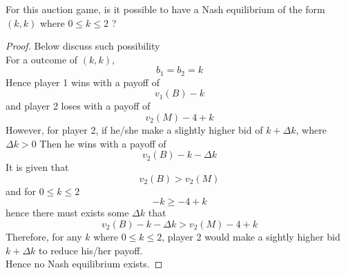 \documentclass[12pt]{article}
\newenvironment{question}[2][Question]{\begin{trivlist}
\item[\hskip \labelsep {\bfseries #1}\hskip \labelsep {\bfseries #2.}]}{\end{trivlist}}
\begin{document}
\begin{question}{2c}
	For this auction game, is it possible to have a Nash equilibrium of the form $(k,k)$ where $0 \leq k \leq 2$ ?
\end{question}
\begin{proof}
	Below discuss such possibility \\
	For a outcome of $(k,k)$,
	\begin{equation}
		b_1=b_2=k
	\end{equation}
	Hence player 1 wins with a payoff of
	\begin{equation}
		v_1(B)-k
	\end{equation}
	and player 2 loses with a payoff of
	\begin{equation}
		v_2(M)-4+k
	\end{equation}
	However, for player 2, if he/she make a slightly higher bid of
	$k+\Delta k$, where $\Delta k > 0$
	Then he wins with a payoff of
	\begin{equation}
		v_2(B)-k-\Delta k
	\end{equation}
	It is given that
	\begin{equation}
		v_2(B)>v_2(M)
	\end{equation}
	and for $0 \leq k \leq 2$
	\begin{equation}
		-k\geq-4+k
	\end{equation}
	hence there must exists some $\Delta k$ that
	\begin{equation}
		v_2(B)-k-\Delta k>v_2(M)-4+k
	\end{equation}
	Therefore, for any $k$ where $0 \leq k \leq 2$, player 2 would make a sightly higher bid $k+\Delta k$ to reduce his/her payoff.\\
	Hence no Nash equilibrium exists.
\end{proof}
\end{document}
